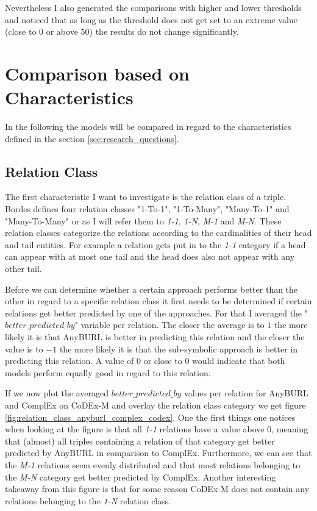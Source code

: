 Nevertheless I also generated the comparisons with higher and lower thresholds and noticed that as long as the threshold does not get set to an extreme value (close to $0$ or above $50$) the results do not change significantly.

\section{Comparison based on Characteristics}
In the following the models will be compared in regard to the characteristics defined in the section \ref{sec:research_questions}.

\subsection{Relation Class}
The first characteristic I want to investigate is the relation class of a triple. Bordes \cite{bordes_translating_2013} defines four relation classes "1-To-1", "1-To-Many", "Many-To-1" and "Many-To-Many" or as I will refer them to \textit{1-1}, \textit{1-N}, \textit{M-1} and \textit{M-N}. These relation classes categorize the relations according to the cardinalities of their head and tail entities. For example a relation gets put in to the \textit{1-1} category if a head can appear with at most one tail and the head does also not appear with any other tail. 

Before we can determine whether a certain approach performs better than the other in regard to a specific relation class it first needs to be determined if certain relations get better predicted by one of the approaches. For that I averaged the "$better\_predicted\_by$" variable per relation. The closer the average is to $1$ the more likely it is that AnyBURL is better in predicting this relation and the closer the value is to $-1$ the more likely it is that the sub-symbolic approach is better in predicting this relation. A value of $0$ or close to $0$ would indicate that both models perform equally good in regard to this relation.

If we now plot the averaged $better\_predicted\_by$ values per relation for AnyBURL and ComplEx on CoDEx-M and overlay the relation class category we get figure \ref{fig:relation_class_anyburl_complex_codex}. One the first things one notices when looking at the figure is that all \textit{1-1} relations have a value above $0$, meaning that (almost) all triples containing a relation of that category get better predicted by AnyBURL in comparison to ComplEx. Furthermore, we can see that the \textit{M-1} relations seem evenly distributed and that most relations belonging to the \textit{M-N} category get better predicted by ComplEx. Another interesting takeaway from this figure is that for some reason CoDEx-M does not contain any relations belonging to the \textit{1-N} relation class. 

